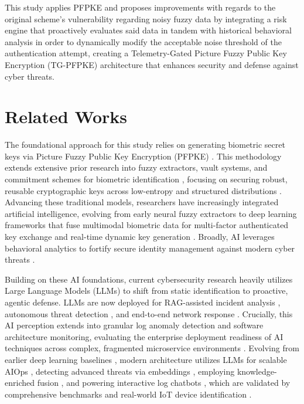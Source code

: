 \documentclass[pdflatex,sn-mathphys-num]{sn-jnl}
\theoremstyle{thmstyleone}%
\theoremstyle{thmstyletwo}%
\theoremstyle{thmstylethree}%
\begin{document}
This study applies PFPKE and proposes improvements with regards to the original scheme’s vulnerability regarding noisy fuzzy data by integrating a risk engine that proactively evaluates said data in tandem with historical behavioral analysis \cite{bib19} in order to dynamically modify the acceptable noise threshold of the authentication attempt, creating a Telemetry-Gated Picture Fuzzy Public Key Encryption (TG-PFPKE) architecture that enhances security and defense against cyber threats. 

\section{Related Works}\label{sec2}

The foundational approach for this study relies on generating biometric secret keys via Picture Fuzzy Public Key Encryption (PFPKE) \cite{bib1}. This methodology extends extensive prior research into fuzzy extractors, vault systems, and commitment schemes for biometric identification \cite{bib2,bib3,bib6}, focusing on securing robust, reusable cryptographic keys across low-entropy and structured distributions \cite{bib7,bib8}. Advancing these traditional models, researchers have increasingly integrated artificial intelligence, evolving from early neural fuzzy extractors \cite{bib11} to deep learning frameworks that fuse multimodal biometric data for multi-factor authenticated key exchange and real-time dynamic key generation \cite{bib4,bib5,bib9,bib10}. Broadly, AI leverages behavioral analytics to fortify secure identity management against modern cyber threats \cite{bib19}.

Building on these AI foundations, current cybersecurity research heavily utilizes Large Language Models (LLMs) to shift from static identification to proactive, agentic defense. LLMs are now deployed for RAG-assisted incident analysis \cite{bib12,bib21,bib22}, autonomous threat detection \cite{bib13}, and end-to-end network response \cite{bib15}. Crucially, this AI perception extends into granular log anomaly detection and software architecture monitoring, evaluating the enterprise deployment readiness of AI techniques across complex, fragmented microservice environments \cite{bib30}. Evolving from earlier deep learning baselines \cite{bib27,bib29}, modern architecture utilizes LLMs for scalable AIOps \cite{bib14,bib23}, detecting advanced threats via embeddings \cite{bib24}, employing knowledge-enriched fusion \cite{bib28}, and powering interactive log chatbots \cite{bib26}, which are validated by comprehensive benchmarks \cite{bib25} and real-world IoT device identification \cite{bib20}.
\end{document}
